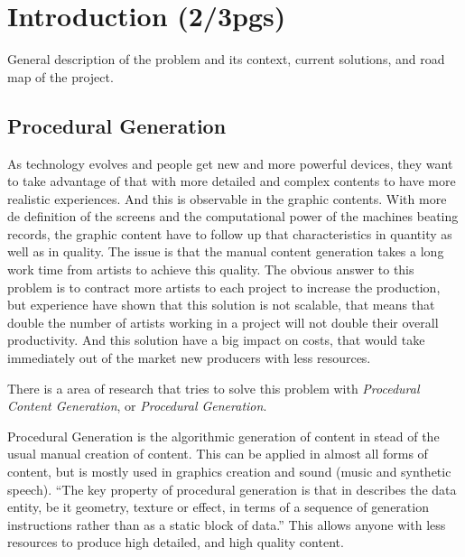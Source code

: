 
% 
% 

\section{Introduction (2/3pgs)}

General description of the problem and its context, current solutions, and road map of the project.

\subsection{Procedural Generation} %
\label{sub:procedural_generation}


As technology evolves and people get new and more powerful devices, they want to take advantage of that with more detailed and complex contents to have more realistic experiences. 
And this is observable in the graphic contents. With more de definition of the screens and the computational power of the machines beating records, the graphic content have to follow up that characteristics in quantity as well as in quality. The issue is that the manual content generation takes a long work time from artists to achieve this quality.
The obvious answer to this problem is to contract more artists to each project to increase the production, but experience have shown that this solution is not scalable, that means that double the number of artists working in a project will not double their overall productivity. And this solution have a big impact on costs, that would take immediately out of the market new producers with less resources.

There is a area of research that tries to solve this problem with \emph{Procedural Content Generation}, or \emph{Procedural Generation}.

Procedural Generation is the algorithmic generation of content in stead of the usual manual creation of content. This can be applied in almost all forms of content, but is mostly used in graphics creation and sound (music and synthetic speech).
``The key property of procedural generation is that in describes the data entity, be it geometry, texture or effect, in terms of a sequence of generation instructions rather than as a static block of data.''\cite{Kelly} This allows anyone with less resources to produce high detailed, and high quality content.



